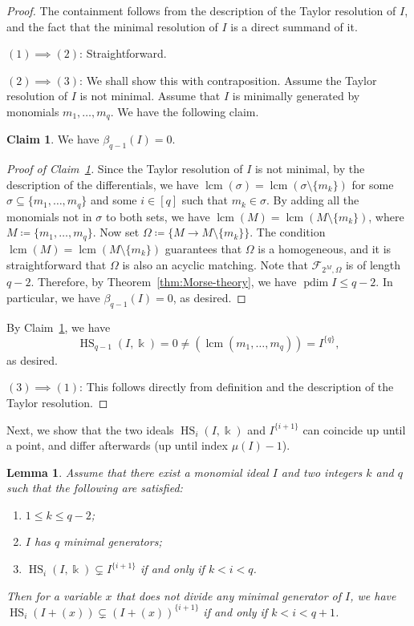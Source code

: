 \documentclass[reqno]{amsart}
\DeclareMathOperator{\lcm}{lcm}
\DeclareMathOperator{\pdim}{pdim}
\DeclareMathOperator{\HS}{HS}
\newtheorem{lemma}[theorem]{Lemma}
\theoremstyle{definition}
\newtheorem{claim}[theorem]{Claim}
\theoremstyle{remark}
\numberwithin{equation}{section}
\begin{document}
\begin{proof}
    The containment follows from the description of the Taylor resolution of $I$, and the fact that the minimal resolution of $I$ is a direct summand of it.
    
    $(1)\implies (2)$: Straightforward.
    
    $(2)\implies (3)$: We shall show this with contraposition.  Assume the Taylor resolution of $I$ is not minimal. Assume that $I$ is minimally generated by monomials $m_1,\dots, m_q$. We have the following claim.
    \begin{claim}\label{clm:taylor-not-minimal}
        We have $\beta_{q-1}(I)=0$.
    \end{claim}
    \begin{proof}[Proof of Claim~\ref{clm:taylor-not-minimal}]
        Since the Taylor resolution of $I$ is not minimal, by the description of the differentials, we have $\lcm(\sigma)=\lcm(\sigma\setminus \{m_k\})$ for some $\sigma\subseteq \{m_1,\dots, m_q\}$ and some $i\in [q]$ such that $m_k\in \sigma$. By adding all the monomials not in $\sigma$ to both sets, we have $\lcm(M)=\lcm(M\setminus \{m_k\})$, where $M\coloneqq \{m_1,\dots, m_q\}$. Now set $\Omega\coloneqq \{ M\to M\setminus \{m_k\} \}$. The condition $\lcm(M)=\lcm(M\setminus \{m_k\})$ guarantees that $\Omega$ is a homogeneous, and it is straightforward that $\Omega$ is also an acyclic matching. Note that $\mathcal{F}_{2^M, \Omega}$  is of length $q-2$. Therefore, by Theorem~\ref{thm:Morse-theory}, we  have $\pdim I \leq q-2$. In particular, we have $\beta_{q-1}(I)=0$, as desired.
    \end{proof}
    By Claim~\ref{clm:taylor-not-minimal}, we have 
    \[
    \HS_{q-1}(I,\Bbbk) =0 \neq (\lcm(m_1,\dots, m_q)) = I^{\{q\}},
    \]
    as desired.

    $(3)\implies (1)$: This follows directly from definition and the description of the Taylor resolution.
\end{proof}

Next, we show that the two ideals $\HS_i(I,\Bbbk)$ and $I^{\{i+1\}}$ can coincide up until a point, and differ afterwards (up until index $\mu(I)-1$). 

\begin{lemma}\label{lem:construction-HS-lcm-power-coincide}
    Assume that there exist a monomial ideal $I$ and two integers $k$ and $q$ such that the following are satisfied:
    \begin{enumerate}
        \item $1\leq k\leq q-2$;
        \item $I$ has $q$ minimal generators;
        \item $\HS_i(I,\Bbbk) \subsetneq I^{\{i+1\}}$ if and only if $k<i<q$.
    \end{enumerate}
    Then for a variable $x$ that does not divide any minimal generator of $I$, we have $\HS_i(I+(x))\subsetneq \left(I+(x) \right)^{\{i+1\}}$ if and only if $k<i< q+1$. 
\end{lemma}
\end{document}
